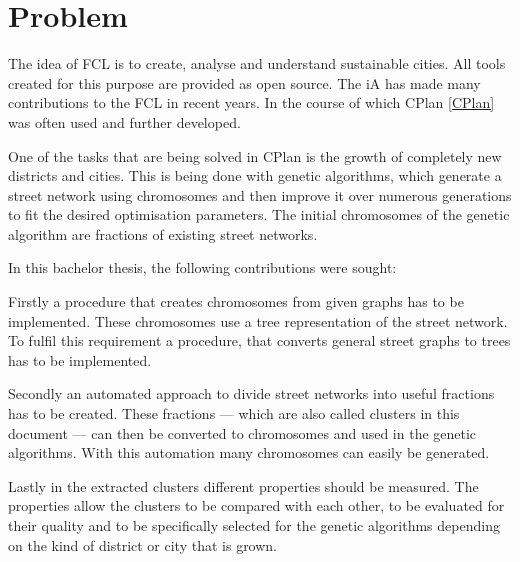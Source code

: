 \chapter{Problem}
The idea of \gls{FCL} is to create, analyse and understand sustainable cities. All tools created for this purpose are provided as open source. The \acrlong{iA} has made many contributions to the \gls{FCL} in recent years. In the course of which CPlan \ref{CPlan} was often used and further developed.

One of the tasks that are being solved in CPlan is the growth of completely new districts and cities. This is being done with genetic algorithms, which generate a street network using chromosomes and then improve it over numerous generations to fit the desired optimisation parameters. The initial chromosomes of the genetic algorithm are fractions of existing street networks.

In this bachelor thesis, the following contributions were sought:

Firstly a procedure that creates chromosomes from given graphs has to be implemented. These chromosomes use a tree representation of the street network. To fulfil this requirement a procedure, that converts general street graphs to trees has to be implemented.

Secondly an automated approach to divide street networks into useful fractions has to be created. These fractions --- which are also called clusters in this document --- can then be converted to chromosomes and used in the genetic algorithms. With this automation many chromosomes can easily be generated.

Lastly in the extracted clusters different properties should be measured. The properties allow the clusters to be compared with each other, to be evaluated for their quality and to be specifically selected for the genetic algorithms depending on the kind of district or city that is grown.
